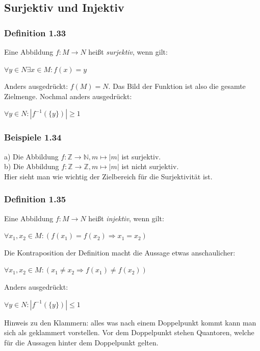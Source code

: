 \documentclass{article}
\begin{document}
\subsection{Surjektiv und Injektiv}

\subsubsection*{Definition 1.33}
Eine Abbildung $f: M \rightarrow N$ heißt \textit{surjektiv}, wenn gilt:
\begin{center}
    $\forall y \in N \exists x \in M: f(x) = y$
\end{center}
Anders ausgedrückt: $f(M) = N$. Das Bild der Funktion ist also die gesamte Zielmenge. Nochmal anders ausgedrückt: 
\begin{center}
    $\forall y \in N: | f^{-1}(\{y\}) | \geq 1$
\end{center}

\subsubsection*{Beispiele 1.34}
a) Die Abbildung $f: \mathbb{Z} \rightarrow \mathbb{N}, m \mapsto |m|$ ist surjektiv. \\
b) Die Abbildung $f: \mathbb{Z} \rightarrow \mathbb{Z}, m \mapsto |m|$ ist nicht surjektiv. \\
Hier sieht man wie wichtig der Zielbereich für die Surjektivität ist. 

\subsubsection*{Definition 1.35}
Eine Abbildung $f: M \rightarrow N$ heißt \textit{injektiv}, wenn gilt:
\begin{center}
    $\forall x_1, x_2 \in M:( f(x_1) = f(x_2) \Rightarrow x_1 = x_2)$
\end{center}
Die Kontraposition der Definition macht die Aussage etwas anschaulicher:
\begin{center}
    $\forall x_1, x_2 \in M:( x_1 \neq x_2 \Rightarrow f(x_1) \neq f(x_2))$
\end{center}
Anders ausgedrückt: 
\begin{center}
    $\forall y \in N: | f^{-1}(\{y\}) | \leq 1$
\end{center}
Hinweis zu den Klammern: alles was nach einem Doppelpunkt kommt kann man sich als geklammert vorstellen. Vor dem Doppelpunkt stehen Quantoren, welche für die Aussagen hinter dem Doppelpunkt gelten.
\end{document}
